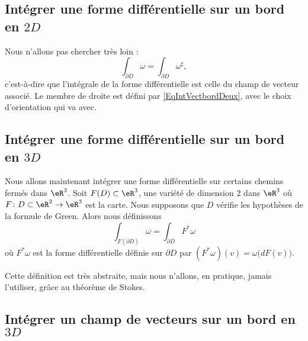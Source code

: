 \subsection{Intégrer une forme différentielle sur un bord en \texorpdfstring{\(  2D\)}{2D}}

Nous n'allons pas chercher très loin :
\begin{equation}
	\int_{\partial D}\omega=\int_{\partial D}\omega^{\sharp},
\end{equation}
c'est-à-dire que l'intégrale de la forme différentielle est celle du champ de vecteur associé. Le membre de droite est défini par \eqref{EqIntVectbordDeux}, avec le choix d'orientation qui va avec.

\subsection{Intégrer une forme différentielle sur un bord en \texorpdfstring{\(  3D\)}{3D}}

Nous allons maintenant intégrer une forme différentielle sur certains chemins fermés dans \( \eR^3\). Soit \( F(D)\subset\eR^3\), une variété de dimension \( 2\) dans \( \eR^3\) où \( F\colon D\subset\eR^2\to \eR^3\) est la carte. Nous supposons que \( D\) vérifie les hypothèses de la formule de Green. Alors nous définissons
\begin{equation}		\label{EqDefIntTroisForBord}
	\int_{F(\partial D)}\omega = \int_{\partial D} F^*\omega
\end{equation}
où \( F^*\omega\) est la forme différentielle définie sur \( \partial D\) par \( (F^*\omega)(v)=\omega\big( dF(v) \big)\).

Cette définition est très abstraite, mais nous n'allons, en pratique, jamais l'utiliser, grâce au théorème de Stokes.

\subsection{Intégrer un champ de vecteurs sur un bord en \texorpdfstring{\(  3D\)}{3D}}

